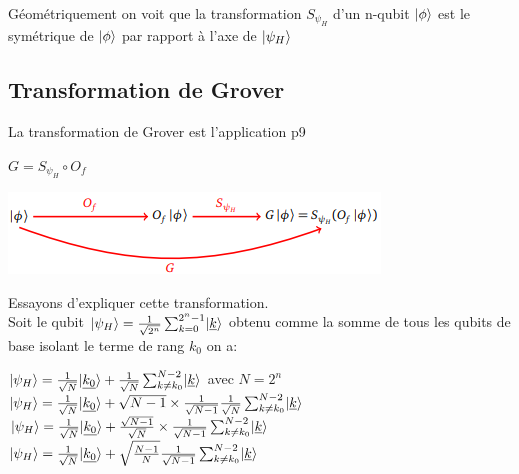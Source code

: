 \documentclass[12pt,openany]{report}
\DeclarePairedDelimiter\ket{\lvert}{\rangle}
\begin{document}
Géométriquement on voit que la transformation $ \mathit{S}_{\psi_H}  $ d'un n-qubit $\ket{\phi} $ est le symétrique de  $\ket{\phi} $ par rapport à l'axe de $\ket{\psi_H}  $

\subsection{Transformation de Grover}
La transformation de Grover est l'application \cite{Arnaud}p9
\begin{center}
$\mathit{G}=\mathit{S}_{\psi_H}\circ \mathit{O}_f$

\includegraphics[scale=1]{./trans_grover}
\end{center}

Essayons d'expliquer cette transformation.\\ Soit le qubit $\ket{\psi_H}=\frac{1}{\sqrt{2^n}} \sum_{k=0}^{2^n-1}\ket{\underline{k}} $ obtenu comme la somme de tous les qubits de base isolant le terme de rang $ k_0$
on a: 
\begin{center}
$ \ket{\psi_H}=\frac{1}{\sqrt{N}}\ket{\underline{k_0}}+\frac{1}{\sqrt{N}} \sum_{k\neq k_0}^{N-2}\ket{\underline{k}} $ avec $N=2^n $\\
$ \ket{\psi_H}=\frac{1}{\sqrt{N}}\ket{\underline{k_0}}+\sqrt{N-1} \times \frac{1}{\sqrt{N-1}} \frac{1}{\sqrt{N}} \sum_{k\neq k_0}^{N-2}\ket{\underline{k}} $ \\
$ \ket{\psi_H}=\frac{1}{\sqrt{N}}\ket{\underline{k_0}}+\frac{\sqrt{N-1}}{\sqrt{N}} \times \frac{1}{\sqrt{N-1}}  \sum_{k\neq k_0}^{N-2}\ket{\underline{k}} $ \\
$ \ket{\psi_H}=\frac{1}{\sqrt{N}}\ket{\underline{k_0}}+\sqrt{\frac{N-1}{N}}  \frac{1}{\sqrt{N-1}}  \sum_{k\neq k_0}^{N-2}\ket{\underline{k}} $ \\


\end{center}
\end{document}
